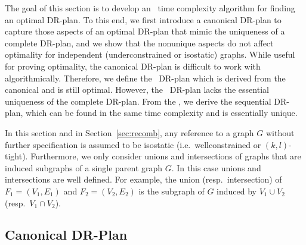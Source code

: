 The goal of this section is to develop an \ComplexityCanDRP\ time complexity algorithm for finding an optimal DR-plan.
To this end, we first introduce a canonical DR-plan to capture those aspects of an optimal DR-plan that mimic the  uniqueness of a complete DR-plan, and we show that the nonunique aspects do not affect optimality for independent (underconstrained or isostatic) graphs.
While useful for proving optimality, the canonical DR-plan is difficult to work with algorithmically. Therefore, we define the \pseudosequential\ DR-plan which is derived from the canonical and is still optimal.
However, the \pseudosequential\ DR-plan lacks the essential uniqueness of the complete DR-plan. From the \pseudosequential, we derive the sequential DR-plan, which can be found in the same time complexity and is essentially unique.

In this section and in Section~\ref{sec:recomb}, any reference to a graph $G$ without further specification is assumed to be isostatic (i.e.\ wellconstrained or $(k,l)$-tight). Furthermore, we only consider unions and intersections of graphs that are induced subgraphs of a single parent graph $G$. In this case unions and intersections are well defined. For example, the union (resp.\ intersection) of $F_1 = (V_1, E_1)$ and $F_2 = (V_2, E_2)$ is the subgraph of $G$ induced by $V_1\cup V_2$ (resp.\ $V_1\cap V_2$).



\subsection{Canonical DR-Plan}





